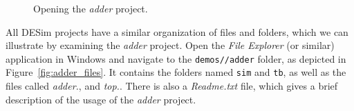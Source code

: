 \begin{figure}[h]
	\begin{center}
        \setlength{\fboxsep}{0pt}
        {}
        {}
	\end{center}
		  \caption{Opening the {\it adder} project.}
	\label{fig:open_windows}
\end{figure}

All DESim projects have a similar organization of files and folders, which we can illustrate
by examining the {\it adder} project. Open the {\it File Explorer} (or similar) application in 
Windows and navigate to the \texttt{demos/\demos/adder} folder, as depicted in 
Figure~\ref{fig:adder_files}. It contains the folders named \texttt{sim} and \texttt{tb}, 
as well as the files called {\it adder.\hdlFileExt}, and {\it top.\hdlFileExt}. There is also 
a {\it Readme.txt} file, which gives a brief description of the usage of the {\it adder} project.

